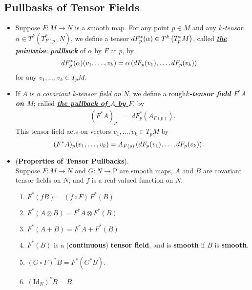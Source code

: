 \documentclass[11pt]{article}
\begin{document}
\subsection{Pullbasks of Tensor Fields}
\begin{itemize}
\item \begin{definition}
Suppose $F: M \rightarrow N$ is a smooth map. For any point $p \in M$ and any \emph{$k$-tensor} $\alpha \in T^k(T^{*}_{F(p)}N)$, we define a tensor $dF_p^{*}(\alpha) \in T^k\left(T^{*}_{p}M\right)$, called \underline{\emph{\textbf{the pointwise pullback}}} of $\alpha$ by $F$ at $p$, by
\begin{align*}
dF_p^{*}(\alpha)(v_1, \ldots, v_k) &= \alpha\left(dF_p(v_1), \ldots, dF_p(v_k)\right)
\end{align*} for any $v_1,\ldots,v_k \in T_pM$. 
\end{definition}

\item \begin{definition}
If $A$ is \emph{a covariant k-tensor field on $N$}, we define a rough\textbf{\emph{$k$-tensor field $F^{*}A$ on $M$}}; called  \underline{\emph{\textbf{the pullback of $A$ by $F$}}}, by
\begin{align*}
(F^{*}A)_{p} &= dF_p^{*}(A_{F(p)}).
\end{align*}
This tensor field acts on vectors $v_1,\ldots,v_k \in T_pM$ by
\begin{align*}
(F^{*}A)_{p}(v_1, \ldots, v_k) &= A_{F(p)}\left(dF_p(v_1), \ldots, dF_p(v_k)\right).
\end{align*}
\end{definition}

\item \begin{proposition} (\textbf{Properties of Tensor Pullbacks}). \\
Suppose $F: M \rightarrow N$ and $G: N \rightarrow $P are smooth maps, $A$ and $B$ are covariant tensor fields on $N$, and $f$ is a real-valued function on $N$.
\begin{enumerate}
\item $F^{*}(fB) = (f \circ F)\,F^{*}(B)$
\item $F^{*}(A \otimes B) = F^{*}A \otimes F^{*}(B)$
\item $F^{*}(A + B) = F^{*}A + F^{*}(B)$
\item $F^{*}(B)$ is a (\textbf{continuous}) \textbf{tensor field}, and is \textbf{smooth} if $B$ is \textbf{smooth}.
\item $(G \circ F)^{*}B = F^{*}(G^{*}B).$
\item $(\text{Id}_N)^{*}B = B.$
\end{enumerate}
\end{proposition}


\end{itemize}
\end{document}
